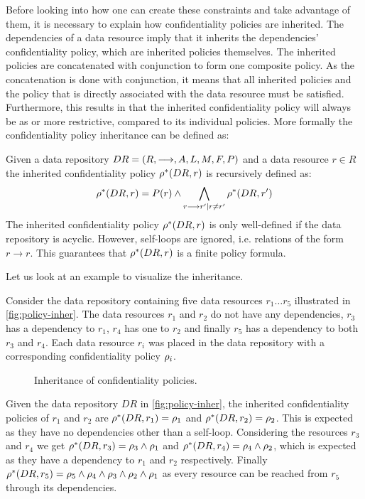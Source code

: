 Before looking into how one can create these constraints and take advantage of them, it is necessary to explain how confidentiality policies are inherited. The dependencies of a data resource imply that it inherits the dependencies' confidentiality policy, which are inherited policies themselves. The inherited policies are concatenated with conjunction to form one composite policy. As the concatenation is done with conjunction, it means that all inherited policies and the policy that is directly associated with the data resource must be satisfied. Furthermore, this results in that the inherited confidentiality policy will always be as or more restrictive, compared to its individual policies. More formally the confidentiality policy inheritance can be defined as:
\begin{definition}\label{def:cpi}
Given a data repository $DR= \left( R, \longrightarrow, A, L, M, F, P \right)$ and a data resource $r \in R$ the inherited confidentiality policy $\rho^{\ast}(DR, r)$ is recursively defined as:
\begin{equation*}
    \rho^{\ast}(DR, r) = P(r) \land \bigwedge\limits_{r \longrightarrow r' \mid r \neq r'} \rho^{\ast}(DR, r')
\end{equation*}
The inherited confidentiality policy $\rho^{\ast}(DR, r)$ is only well-defined if the data repository is acyclic. However, self-loops are ignored, i.e. relations of the form $r \longrightarrow r$. This guarantees that $\rho^{\ast}(DR, r)$ is a finite policy formula.
\end{definition}

Let us look at an example to visualize the inheritance.
\begin{example}
Consider the data repository containing five data resources $r_1\ldots r_5$ illustrated in \autoref{fig:policy-inher}. The data resources $r_1$ and $r_2$ do not have any dependencies, $r_3$ has a dependency to $r_1$, $r_4$ has one to $r_2$ and finally $r_5$ has a dependency to both $r_3$ and $r_4$. Each data resource $r_i$ was placed in the data repository with a corresponding confidentiality policy $\rho_i$.
\begin{figure}[!ht]
    \begin{center}
        
        \caption{Inheritance of confidentiality policies.}
        \label{fig:policy-inher}
    \end{center}
\end{figure}
Given the data repository $DR$ in \autoref{fig:policy-inher}, the inherited confidentiality policies of $r_1$ and $r_2$ are $\rho^{\ast}(DR, r_1) = \rho_1$ and $\rho^{\ast}(DR, r_2) = \rho_2$. This is expected as they have no dependencies other than a self-loop. Considering the resources $r_3$ and $r_4$ we get $\rho^{\ast}(DR, r_3) = \rho_3 \land \rho_1$ and $\rho^{\ast}(DR, r_4) = \rho_4 \land \rho_2$, which is expected as they have a dependency to $r_1$ and $r_2$ respectively. Finally $\rho^{\ast}(DR, r_5) = \rho_5 \land \rho_4 \land \rho_3 \land \rho_2 \land \rho_1$ as every resource can be reached from $r_5$ through its dependencies.
\end{example}


